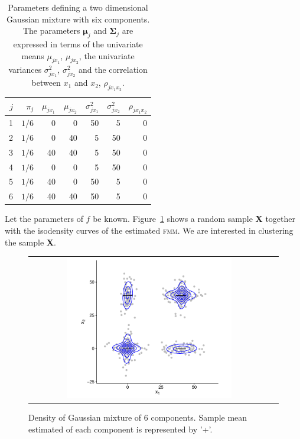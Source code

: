 \documentclass[submit]{smj}
\theoremstyle{definition}
\newcommand{\m}[1]{\boldsymbol{#1}}
\newcommand{\fmm}{\textsc{fmm}\xspace}
\begin{document}
\begin{table}[t]
\centering
\begin{tabular}{rrrrrrr}
  \hline
$j$ & $\pi_j$ & $\mu_{j x_1}$ & $\mu_{j x_2}$ & $\sigma^2_{j x_1}$ & $\sigma^2_{j x_2}$ & $\rho_{j x_1 x_2}$ \\ 
  \hline
  1 &  $1/6$ &     0 &     0 &    50 &     5 &     0 \\ 
  2 &  $1/6$  &     0 &    40 &     5 &    50 &     0 \\ 
  3 &  $1/6$  &    40 &    40 &     5 &    50 &     0 \\ 
  4 &  $1/6$  &     0 &     0 &     5 &    50 &     0 \\ 
  5 &  $1/6$  &    40 &     0 &    50 &     5 &     0 \\ 
  6 &  $1/6$  &    40 &    40 &    50 &     5 &     0 \\ 
   \hline
\end{tabular}
\caption{Parameters defining a two dimensional Gaussian mixture with six components. The parameters $\m\mu_j$ and $\m\Sigma_j$ are expressed in terms of the univariate means $\mu_{j x_1}$, $\mu_{j x_2}$, the univariate variances $\sigma^2_{j x_1}$, $\sigma^2_{j x_2}$ and the correlation between $x_1$ and $x_2$, $\rho_{j x_1 x_2}$.}
\label{pars_table}
\end{table}


Let the parameters of $f$ be known. Figure~\ref{ex_mixture} shows a random sample \textbf{X} together with the isodensity curves of the estimated \fmm. We are interested in clustering the sample \textbf{X}.

\begin{figure}[htbp]
\begin{center}
\begin{tabular}{cc}
  \includegraphics[width=0.7\textwidth]{figures/partition-example-mixture.pdf} \\
 \end{tabular}
 \caption{Density of Gaussian mixture of 6 components. Sample mean estimated of each component is represented by '+'.}\label{ex_mixture}
\end{center}
\end{figure}
\end{document}
